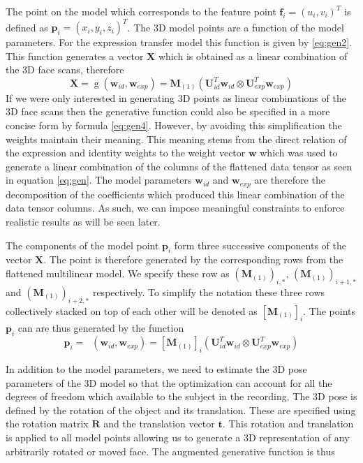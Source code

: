 \documentclass[11pt,a4paper,twoside]{report}
\begin{document}
The point on the model
which corresponds to the feature point $\mathbf{f}_i = (u_i,v_i)^T$ is defined as $\mathbf{p}_i = (x_i,y_i,z_i)^T$. The 3D model
points are a function of the model parameters. For the expression transfer model
this function is given by \ref{eq:gen2}. This function generates a vector
$\mathbf{X}$ which is 
obtained as a linear combination of the 3D face scans, therefore 
\begin{equation}\label{eq:fit1}
\mathbf{X} = \mathop{g}(\mathbf{w}_{id},\mathbf{w}_{exp})= \mathbf{M}_{(1)}(\mathbf{U}_{id}^T\mathbf{w}_{id} \otimes
\mathbf{U}_{exp}^T\mathbf{w}_{exp})
\end{equation}
If we were only interested in
generating 3D points as linear combinations of the 3D face scans 
then the generative function could also be specified in a more concise form by
formula \ref{eq:gen4}. However, by avoiding this simplification the weights
maintain their meaning. This meaning stems from the direct relation of the
expression and identity weights to the weight vector $\mathbf{w}$ which was used
to generate a linear combination of the columns of the flattened data
tensor as seen in equation \ref{eq:gen}. The model parameters $\mathbf{w}_{id}$
and $\mathbf{w}_{exp}$ are therefore the decomposition of the coefficients which produced this
linear combination of the data tensor columns. As such, we can impose meaningful
constraints to enforce realistic results as will be seen later. 

The components of the model point $\mathbf{p}_i$ form three successive components of the vector
$\mathbf{X}$. The point is therefore
generated by the corresponding rows from the flattened multilinear
model. We specify these row as $(\mathbf{M}_{(1)})_{i,*}$,
$(\mathbf{M}_{(1)})_{i+1,*}$ and $(\mathbf{M}_{(1)})_{i+2,*}$ respectively. To
simplify the notation these three rows collectively stacked on top of each other
will be denoted as
$[\mathbf{M}_{(1)}]_{i}$. The points $\mathbf{p}_i$ can are thus generated by the function
\begin{equation}\label{eq:fit2}
\mathbf{p}_i = \mathop{g_i}(\mathbf{w}_{id},\mathbf{w}_{exp})
= [\mathbf{M}_{(1)}]_{i}(\mathbf{U}_{id}^T\mathbf{w}_{id} \otimes \mathbf{U}_{exp}^T\mathbf{w}_{exp})
\end{equation}

In addition to the model parameters, we need
to estimate the 3D pose parameters of the 3D model so that the optimization can
account for all the degrees of freedom which available to the subject in the recording. The 3D
pose is defined by the rotation of the object and its translation. These are
specified using the rotation matrix $\mathbf{R}$ and the translation vector
$\mathbf{t}$. This rotation and translation is applied to all model points
allowing us to generate a 3D representation of any arbitrarily rotated or
 moved face. The augmented generative function is thus
\end{document}
